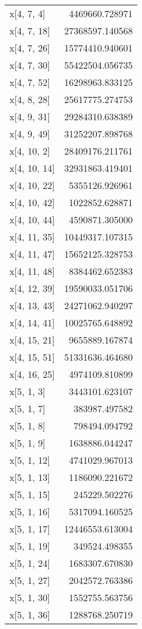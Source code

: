 \begin{longtable}{lr}
x[4, 7, 4] & 4469660.728971 \\
x[4, 7, 18] & 27368597.140568 \\
x[4, 7, 26] & 15774410.940601 \\
x[4, 7, 30] & 55422504.056735 \\
x[4, 7, 52] & 16298963.833125 \\
x[4, 8, 28] & 25617775.274753 \\
x[4, 9, 31] & 29284310.638389 \\
x[4, 9, 49] & 31252207.898768 \\
x[4, 10, 2] & 28409176.211761 \\
x[4, 10, 14] & 32931863.419401 \\
x[4, 10, 22] & 5355126.926961 \\
x[4, 10, 42] & 1022852.628871 \\
x[4, 10, 44] & 4590871.305000 \\
x[4, 11, 35] & 10449317.107315 \\
x[4, 11, 47] & 15652125.328753 \\
x[4, 11, 48] & 8384462.652383 \\
x[4, 12, 39] & 19590033.051706 \\
x[4, 13, 43] & 24271062.940297 \\
x[4, 14, 41] & 10025765.648892 \\
x[4, 15, 21] & 9655889.167874 \\
x[4, 15, 51] & 51331636.464680 \\
x[4, 16, 25] & 4974109.810899 \\
x[5, 1, 3] & 3443101.623107 \\
x[5, 1, 7] & 383987.497582 \\
x[5, 1, 8] & 798494.094792 \\
x[5, 1, 9] & 1638886.044247 \\
x[5, 1, 12] & 4741029.967013 \\
x[5, 1, 13] & 1186090.221672 \\
x[5, 1, 15] & 245229.502276 \\
x[5, 1, 16] & 5317094.160525 \\
x[5, 1, 17] & 12446553.613004 \\
x[5, 1, 19] & 349524.498355 \\
x[5, 1, 24] & 1683307.670830 \\
x[5, 1, 27] & 2042572.763386 \\
x[5, 1, 30] & 1552755.563756 \\
x[5, 1, 36] & 1288768.250719 \\

\end{longtable}
